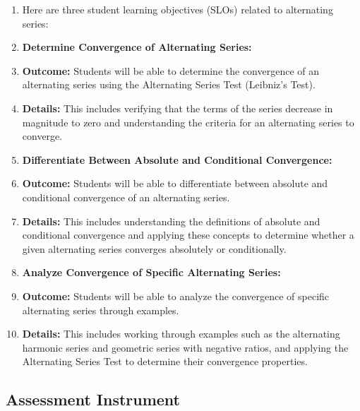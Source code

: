 \begin{enumerate}
    \item Here are three student learning objectives (SLOs) related to alternating series:
    \item \textbf{Determine Convergence of Alternating Series:}
    \item \textbf{Outcome:} Students will be able to determine the convergence of an alternating series using the Alternating Series Test (Leibniz's Test).
    \item \textbf{Details:} This includes verifying that the terms of the series decrease in magnitude to zero and understanding the criteria for an alternating series to converge.
    \item \textbf{Differentiate Between Absolute and Conditional Convergence:}
    \item \textbf{Outcome:} Students will be able to differentiate between absolute and conditional convergence of an alternating series.
    \item \textbf{Details:} This includes understanding the definitions of absolute and conditional convergence and applying these concepts to determine whether a given alternating series converges absolutely or conditionally.
    \item \textbf{Analyze Convergence of Specific Alternating Series:}
    \item \textbf{Outcome:} Students will be able to analyze the convergence of specific alternating series through examples.
    \item \textbf{Details:} This includes working through examples such as the alternating harmonic series and geometric series with negative ratios, and applying the Alternating Series Test to determine their convergence properties.
\end{enumerate}

\subsection{Assessment Instrument}

